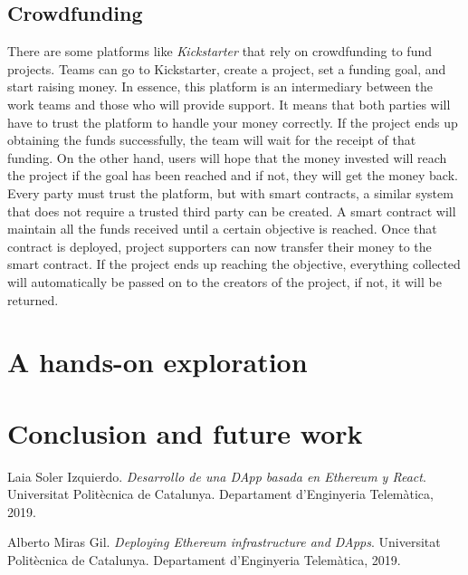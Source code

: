 \documentclass[10pt]{article}
\begin{document}
\begin{multicols}{2}
\subsection{Crowdfunding}

There are some platforms like \textit{Kickstarter} that rely on crowdfunding to fund projects. Teams can go to Kickstarter, create a project, set a funding goal, and start raising money. In essence, this platform is an intermediary between the work teams and those who will provide support. It means that both parties will have to trust the platform to handle your money correctly. If the project ends up obtaining the funds successfully, the team will wait for the receipt of that funding. On the other hand, users will hope that the money invested will reach the project if the goal has been reached and if not, they will get the money back.\\

Every party must trust the platform, but with smart contracts, a similar system that does not require a trusted third party can be created. A smart contract will maintain all the funds received until a certain objective is reached. Once that contract is deployed, project supporters can now transfer their money to the smart contract. If the project ends up reaching the objective, everything collected will automatically be passed on to the creators of the project, if not, it will be returned.

\section{A hands-on exploration}

\section{Conclusion and future work}

\begin{thebibliography}{100}


Laia Soler Izquierdo. 
\textit{Desarrollo de una DApp basada en Ethereum y React}. 
Universitat Politècnica de Catalunya. Departament d'Enginyeria Telemàtica, 2019.

Alberto Miras Gil. 
\textit{Deploying Ethereum infrastructure and DApps}. 
Universitat Politècnica de Catalunya. Departament d'Enginyeria Telemàtica, 2019.


\end{thebibliography}
\end{multicols}
\end{document}
